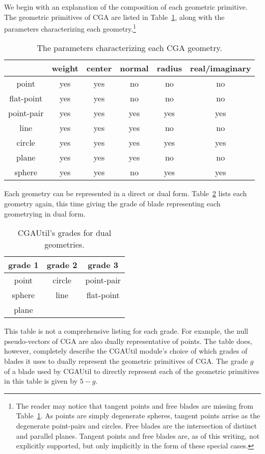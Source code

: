 \documentclass[12pt]{article}
\begin{document}
We begin with an explanation of the composition of each geometric primitive.
The geometric primitives of CGA are listed in Table~\ref{table_geo_char}, along with
the parameters characterizing each geometry.\footnote{The reader may notice
that tangent points and free blades are missing from Table~\ref{table_geo_char}.
As points are simply degenerate spheres, tangent points arrise as the degenerate
point-pairs and circles.  Free blades are the intersection of distinct and parallel planes.
Tangent points and free blades are, as of this writing, not explicitly supported, but only implicitly
in the form of these special cases.}
\begin{table}
\begin{center}
\begin{tabular}{|c|c|c|c|c|c|}
\hline
 & weight & center & normal & radius & real/imaginary \\
\hline
point & yes & yes & no & no & no \\
\hline
flat-point & yes & yes & no & no & no \\
\hline
point-pair & yes & yes & yes & yes & yes \\
\hline
line & yes & yes & yes & no & no \\
\hline
circle & yes & yes & yes & yes & yes \\
\hline
plane & yes & yes & yes & no & no \\
\hline
sphere & yes & yes & no & yes & yes \\
\hline
\end{tabular}
\caption{The parameters characterizing each CGA geometry.}\label{table_geo_char}
\end{center}
\end{table}
Each geometry can be represented in a direct or dual form.
Table~\ref{tab_geo_dual_grades} lists each geometry again, this time giving
the grade of blade representing each geometrying in dual form.
\begin{table}
\begin{center}
\begin{tabular}{|c|c|c|}
\hline
grade 1 & grade 2 & grade 3 \\
\hline
point & circle & point-pair \\
\hline
sphere & line & flat-point \\
\hline
plane & & \\
\hline
\end{tabular}
\caption{CGAUtil's grades for dual geometries.}\label{tab_geo_dual_grades}
\end{center}
\end{table}
This table is not a comprehensive listing for each grade.
For example, the null pseudo-vectors of CGA are also dually
representative of points.  The table does, however, completely
describe the CGAUtil module's choice of which grades of blades it uses
to dually represent the geometric primitives of CGA.
The grade $g$ of a blade used by CGAUtil to directly represent each of the
geometric primitives in this table is given by $5-g$.
\end{document}
